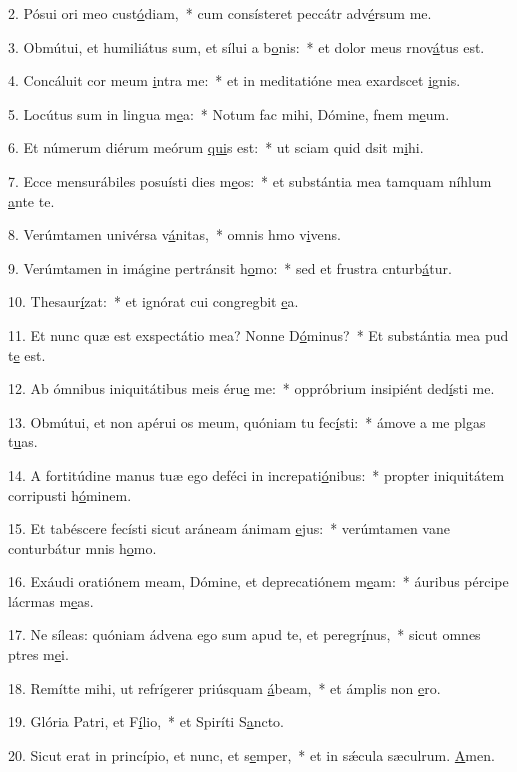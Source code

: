2. Pósui ori meo cust\uline{ó}diam,~* cum consísteret peccátr adv\uline{é}rsum me.\par 
3. Obmútui, et humiliátus sum, et sílui a b\uline{o}nis:~* et dolor meus rnov\uline{á}tus est.\par 
4. Concáluit cor meum \uline{i}ntra me:~* et in meditatióne mea exardscet \uline{i}gnis.\par 
5. Locútus sum in lingua m\uline{e}a:~* Notum fac mihi, Dómine, fnem m\uline{e}um.\par 
6. Et númerum diérum meórum \uline{qui}s est:~* ut sciam quid dsit m\uline{i}hi.\par 
7. Ecce mensurábiles posuísti dies m\uline{e}os:~* et substántia mea tamquam níhlum \uline{a}nte te.\par 
8. Verúmtamen univérsa v\uline{á}nitas,~* omnis hmo v\uline{i}vens.\par 
9. Verúmtamen in imágine pertránsit h\uline{o}mo:~* sed et frustra cnturb\uline{á}tur.\par 
10. Thesaur\uline{í}zat:~* et ignórat cui congregbit \uline{e}a.\par 
11. Et nunc quæ est exspectátio mea? Nonne D\uline{ó}minus?~* Et substántia mea pud t\uline{e} est.\par 
12. Ab ómnibus iniquitátibus meis éru\uline{e} me:~* oppróbrium insipiént ded\uline{í}sti me.\par 
13. Obmútui, et non apérui os meum, quóniam tu fec\uline{í}sti:~* ámove a me plgas t\uline{u}as.\par 
14. A fortitúdine manus tuæ ego deféci in increpati\uline{ó}nibus:~* propter iniquitátem corripusti h\uline{ó}minem.\par 
15. Et tabéscere fecísti sicut aráneam ánimam \uline{e}jus:~* verúmtamen vane conturbátur mnis h\uline{o}mo.\par 
16. Exáudi oratiónem meam, Dómine, et deprecatiónem m\uline{e}am:~* áuribus pércipe lácrmas m\uline{e}as.\par 
17. Ne síleas: quóniam ádvena ego sum apud te, et peregr\uline{í}nus,~* sicut omnes ptres m\uline{e}i.\par 
18. Remítte mihi, ut refrígerer priúsquam \uline{á}beam,~* et ámplis non \uline{e}ro.\par 
19. Glória Patri, et F\uline{í}lio,~* et Spiríti S\uline{a}ncto.\par 
20. Sicut erat in princípio, et nunc, et s\uline{e}mper,~* et in sǽcula sæculrum. \uline{A}men.\par 
